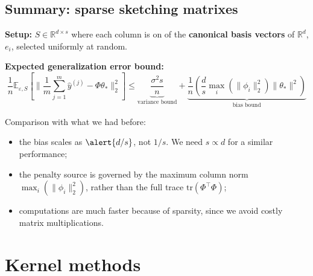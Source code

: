 \documentclass[
11pt,notheorems,hyperref={pdfauthor=whatever}
]{beamer}
\begin{document}
\subsection{Summary: sparse sketching matrixes}
\begin{frame}
    \textbf{Setup:} \(S \in \mathbb{R}^{d \times s}\) where each column is on of the \alert{\textbf{canonical basis vectors}} of \(\mathbb{R}^d\), \(e_i\), selected uniformly at random.

    \vspace{0.5em}
    \textbf{Expected generalization error bound:}
    \[
        \frac{1}{n} \mathbb{E}_{\varepsilon, S} \left[ \bigg\| \frac{1}{m} \sum_{j=1}^m \hat{y}^{(j)} - \Phi\theta_* \bigg\|_2^2 \right] \le \underbrace{\frac{\sigma^2 s}{n}}_{\text{variance bound}} + \underbrace{\frac{1}{n} \left( \frac{d}{s} \max_i(\|\phi_i\|_2^2) \|\theta_*\|^2 \right)}_{\text{bias bound}}
    \]

    \vspace{0.5em}
    \begin{block}{Comparison with what we had before:}
        \begin{itemize}
            \item the bias scales as \(\alert{d/s}\), not \(1/s\). We need \(s \propto d\) for a similar performance;
            \item the penalty source is governed by the \alert{maximum column norm} \(\max_i(\|\phi_i\|_2^2)\), rather than the full trace \(\text{tr}(\Phi^\top\Phi)\);
            \item computations are much faster because of sparsity, since we avoid costly matrix multiplications.
        \end{itemize}
    \end{block}
\end{frame}

\section{Kernel methods}
\end{document}
